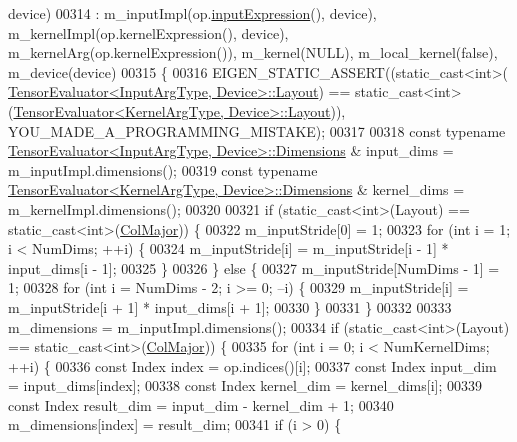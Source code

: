 \begin{DoxyCode}
      device)
00314       : m\_inputImpl(op.\hyperlink{class_eigen_1_1_tensor_convolution_op_a57097fbe6e0a033d587e98654f0bd664}{inputExpression}(), device), m\_kernelImpl(op.kernelExpression(), 
      device), m\_kernelArg(op.kernelExpression()), m\_kernel(NULL), m\_local\_kernel(\textcolor{keyword}{false}), m\_device(device)
00315   \{
00316     EIGEN\_STATIC\_ASSERT((static\_cast<int>(
      \hyperlink{struct_eigen_1_1_tensor_evaluator}{TensorEvaluator<InputArgType, Device>::Layout}) == 
      static\_cast<int>(\hyperlink{struct_eigen_1_1_tensor_evaluator}{TensorEvaluator<KernelArgType, Device>::Layout})), 
      YOU\_MADE\_A\_PROGRAMMING\_MISTAKE);
00317 
00318     \textcolor{keyword}{const} \textcolor{keyword}{typename} \hyperlink{struct_eigen_1_1_tensor_evaluator}{TensorEvaluator<InputArgType, Device>::Dimensions}
      & input\_dims = m\_inputImpl.dimensions();
00319     \textcolor{keyword}{const} \textcolor{keyword}{typename} \hyperlink{struct_eigen_1_1_tensor_evaluator}{TensorEvaluator<KernelArgType, Device>::Dimensions}
      & kernel\_dims = m\_kernelImpl.dimensions();
00320 
00321     \textcolor{keywordflow}{if} (static\_cast<int>(Layout) == static\_cast<int>(\hyperlink{group__enums_ggaacded1a18ae58b0f554751f6cdf9eb13a0cbd4bdd0abcfc0224c5fcb5e4f6669a}{ColMajor})) \{
00322       m\_inputStride[0] = 1;
00323       \textcolor{keywordflow}{for} (\textcolor{keywordtype}{int} i = 1; i < NumDims; ++i) \{
00324         m\_inputStride[i] = m\_inputStride[i - 1] * input\_dims[i - 1];
00325       \}
00326     \} \textcolor{keywordflow}{else} \{
00327       m\_inputStride[NumDims - 1] = 1;
00328       \textcolor{keywordflow}{for} (\textcolor{keywordtype}{int} i = NumDims - 2; i >= 0; --i) \{
00329         m\_inputStride[i] = m\_inputStride[i + 1] * input\_dims[i + 1];
00330       \}
00331     \}
00332 
00333     m\_dimensions = m\_inputImpl.dimensions();
00334     \textcolor{keywordflow}{if} (static\_cast<int>(Layout) == static\_cast<int>(\hyperlink{group__enums_ggaacded1a18ae58b0f554751f6cdf9eb13a0cbd4bdd0abcfc0224c5fcb5e4f6669a}{ColMajor})) \{
00335       \textcolor{keywordflow}{for} (\textcolor{keywordtype}{int} i = 0; i < NumKernelDims; ++i) \{
00336         \textcolor{keyword}{const} Index index = op.indices()[i];
00337         \textcolor{keyword}{const} Index input\_dim = input\_dims[index];
00338         \textcolor{keyword}{const} Index kernel\_dim = kernel\_dims[i];
00339         \textcolor{keyword}{const} Index result\_dim = input\_dim - kernel\_dim + 1;
00340         m\_dimensions[index] = result\_dim;
00341         \textcolor{keywordflow}{if} (i > 0) \{

\end{DoxyCode}
